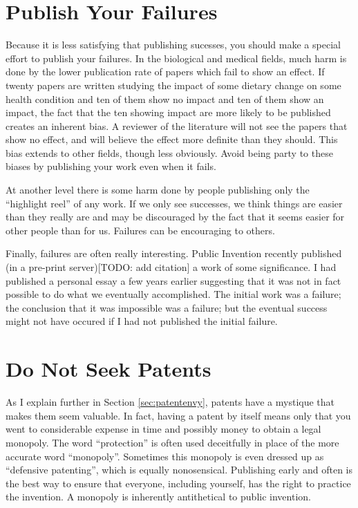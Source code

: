 \documentclass[
	fontsize=10pt, %
	twoside=false, %
	secnumdepth=1, %
]{kaobook}
\begin{document}
\section{Publish Your Failures}

Because it is less satisfying that publishing sucesses, you should
make a special effort to publish your failures.
In the biological and medical fields, much harm is done by
the lower publication rate of papers which fail to show an effect.
If twenty papers are written studying the impact of some dietary change
on some health condition and ten of them show no impact and ten of them
show an impact, the fact that the ten showing impact are more likely
to be published creates an inherent bias.
A reviewer of the literature will not see the papers that show no effect,
and will believe the effect more definite than they should.
This bias extends to other fields, though less obviously.
Avoid being party to these biases by publishing your work even when it fails.

At another level there is some harm done by people publishing only
the ``highlight reel'' of any work. If we only see successes, we think
things are easier than they really are and may be discouraged by the
fact that it seems easier for other people than for us.
Failures can be encouraging to others.

Finally, failures are often really interesting.
Public Invention recently published (in a pre-print server)[TODO: add citation]
a work of some significance. I had published a personal essay a few years earlier
suggesting that it was not in fact possible to do what we eventually accomplished.
The initial work was a failure; the conclusion that it was impossible was a failure;
but the eventual success might not have occured if I had not published the initial failure.

\section{Do Not Seek Patents}

As I explain further in Section \ref{sec:patentenvy}, patents have a mystique
that makes them seem valuable. In fact, having a patent by itself means only
that you went to considerable expense in time and possibly money to obtain a legal monopoly.
The word ``protection'' is often used deceitfully in place of the more accurate word ``monopoly''.
Sometimes this monopoly is even dressed up as ``defensive patenting'', which is
equally nonosensical.
Publishing early and often is the best way to ensure that everyone, including yourself,
has the right to practice the invention.
A monopoly is inherently antithetical to public invention.
\end{document}
